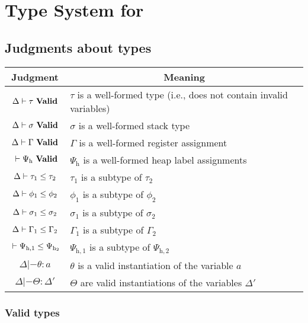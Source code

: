\chapter{Type System for \ATAL}
\label{chap:types}

\section{Judgments about types}

\begin{tabular}{|c|p{7.5 cm}|}
  \hline
  Judgment & \multicolumn{1}{|c|}{Meaning} \\
  \hline

  $\valid{\Delta}{\tau}$ & $\tau$ is a well-formed type (i.e., does not contain invalid variables) \\
  ${\Delta} |- {\sigma}\ \mathbf{Valid}$ & $\sigma$ is a well-formed stack type \\
  ${\Delta} |- {\Gamma}\ \mathbf{Valid}$ & $\Gamma$ is a well-formed register assignment \\
  ${} |- {\Psi_{\mathrm{h}}}\ \mathbf{Valid}$ & $\Psi_{\mathrm{h}}$ is a well-formed heap label assignments \\
  \hline

  ${\Delta} |- {\tau_1} \le {\tau_2}$ & $\tau_1$ is a subtype of $\tau_2$ \\
  ${\Delta} |- {\phi_1} \le {\phi_2}$ & $\phi_1$ is a subtype of $\phi_2$ \\
  ${\Delta} |- {\sigma_1} \le {\sigma_2}$ & $\sigma_1$ is a subtype of $\sigma_2$ \\
  ${\Delta} |- {\Gamma_1} \le {\Gamma_2}$ & $\Gamma_1$ is a subtype of $\Gamma_2$ \\
  ${} |- {\Psi_{\mathrm{h},1}} \le {\Psi_{\mathrm{h}_2}}$ & $\Psi_{\mathrm{h},1}$ is a subtype of $\Psi_{\mathrm{h},2}$ \\
  \hline

  $\Delta |- \theta : a$ & $\theta$ is a valid instantiation of the variable $a$ \\
  $\Delta |- \Theta : \Delta'$ & $\Theta$ are valid instantiations of the variables $\Delta'$ \\
  \hline
\end{tabular}


\subsection{Valid types}
\fbox{$\valid{\Delta}{\tau}$}

